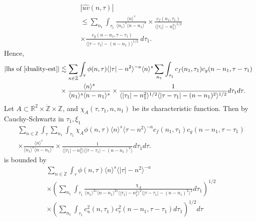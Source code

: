\documentclass[12pt,reqno]{amsart}
\numberwithin{equation}{section}  %
\renewcommand{\cref}{\Cref}
\newcommand{\rr}{\mathbb{R}}
\newcommand{\zz}{\mathbb{Z}}
\newcommand{\zzdot}{\dot{\zz}}
\newcommand{\wh}{\widehat}
\begin{document}
%
%
\begin{equation}
	\label{convo-est-starting-pnt}
	\begin{split}
		 &  | \wh{uv}\left( 
		n, \tau \right) |
		\\
		& \le  
		\sum_{n_{1}} \int_{\tau_{1}} \frac{\langle n \rangle^{s}}{\langle n_1 \rangle^s
    \langle n - n_1 \rangle^s} 
    \times \frac{c_f(n_1, \tau_1)}{\langle |\tau_1| - n_1^{2} \rangle^{1/2}}
		\\
		& \times
		\frac{c_g(n - n_1, \tau - \tau_1 )}{\langle |\tau - \tau_1| - (n - n_1)
		\rangle^{1/2}}\ d \tau_1.
	\end{split}
\end{equation}
%
%
Hence, 
%
%
\begin{equation}
  \label{pre-fubini-int-form}
	\begin{split}
    |\text{lhs of} \ \cref{duality-est}|
    & \lesssim \sum_{n \in \zzdot} \int_{\tau} \phi(n, \tau)\langle | \tau | - n^{2} \rangle^{-a}  \langle n \rangle^s 
  \sum_{n_{1}}
  \int_{\tau_{1}} c_f(n_1, \tau_1)
		c_g(n - n_1, \tau - \tau_1 )
		\\
    & \times \frac{\langle n \rangle ^{s}}{\langle n_{1} \rangle ^{s} \langle
    n-n_{1} \rangle ^{s}} \times \frac{1}{\langle |\tau_{1}|-n_{1}^{2} \rangle^{1/2}\langle | \tau -
    \tau_{1}|-(n - n_{1})^{2}
    \rangle^{1/2}} d \tau_1 d \tau.
	\end{split}
\end{equation}
%
%
%
Let $A \subset \rr^{2} \times \zzdot \times \zz$, and $\chi_{A}(\tau, \tau_{1}, n, n_{1})$
be its
characteristic function. Then by Cauchy-Schwartz in
$\tau_{1}, \xi_{1}$
\begin{equation*}
	\begin{split}
    & \sum_{n \in \zzdot} \int_{\tau}   \sum_{n_{1}}
    \int_{\tau_{1}} \chi_{A}
    \phi(n, \tau) \langle n \rangle^s \langle \tau - n^{2} \rangle^{-a}
  c_f(n_1, \tau_1)
		c_g(n - n_1, \tau - \tau_1 )
		\\
    & \times \frac{\langle n \rangle ^{s}}{\langle n_{1} \rangle ^{s} \langle
    n-n_{1} \rangle ^{s}} \times \frac{1}{\langle |\tau_{1}|-n_{1}^{2} \rangle\langle | \tau -
    \tau_{1}|-(n - n_{1})^{2}
    \rangle} d \tau_1 d \tau.
	\end{split}
\end{equation*}
%
is bounded by 
%
%
\begin{equation}
	\label{10g}
	\begin{split}
    & \sum_{n \in \zzdot} \int_{\tau} \phi(n, \tau) \langle n \rangle ^{s}
    \langle | \tau | - n^{2} \rangle ^{-a}
    \\
    & \times \left( \sum_{n_{1}} \int_{\tau_{1}}
    \frac{\chi_{A}}{\langle n_{1} \rangle ^{2s} \langle n-n_{1} \rangle ^{2s} \langle |
    \tau_{1} | - n_{1}^{2}\rangle^{2}  \langle | \tau - \tau_{1} | -
    (n - n_{1})^{2} \rangle^{2}} d \tau_{1} \right)^{1/2}
    \\
    & \times \left( \sum_{n_{1}} \int_{\tau_{1}} c_{u}^{2}(n, \tau_{1})
    c_{v}^{2}(n - n_{1}, \tau - \tau_{1}) d \tau_{1} \right)^{1/2} d \tau
  \end{split}
\end{equation}
\end{document}
